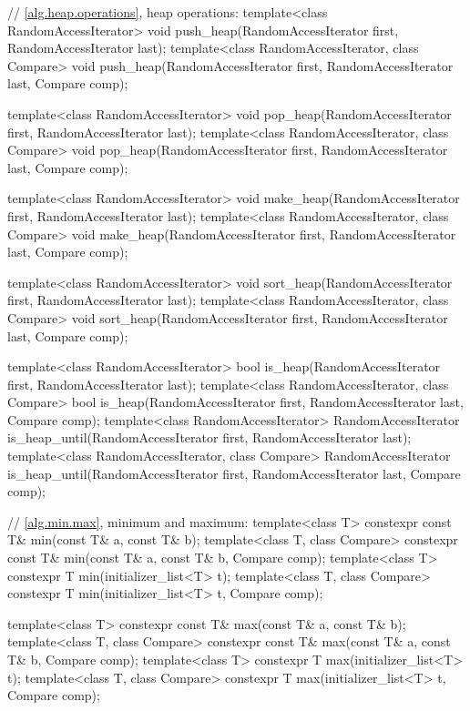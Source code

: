 \begin{codeblock}
{  // \ref{alg.heap.operations}, heap operations:
  template<class RandomAccessIterator>
    void push_heap(RandomAccessIterator first, RandomAccessIterator last);
  template<class RandomAccessIterator, class Compare>
    void push_heap(RandomAccessIterator first, RandomAccessIterator last,
                   Compare comp);

  template<class RandomAccessIterator>
    void pop_heap(RandomAccessIterator first, RandomAccessIterator last);
  template<class RandomAccessIterator, class Compare>
    void pop_heap(RandomAccessIterator first, RandomAccessIterator last,
                  Compare comp);

  template<class RandomAccessIterator>
    void make_heap(RandomAccessIterator first, RandomAccessIterator last);
  template<class RandomAccessIterator, class Compare>
    void make_heap(RandomAccessIterator first, RandomAccessIterator last,
                   Compare comp);

  template<class RandomAccessIterator>
    void sort_heap(RandomAccessIterator first, RandomAccessIterator last);
  template<class RandomAccessIterator, class Compare>
    void sort_heap(RandomAccessIterator first, RandomAccessIterator last,
                   Compare comp);

  template<class RandomAccessIterator>
    bool is_heap(RandomAccessIterator first, RandomAccessIterator last);
  template<class RandomAccessIterator, class Compare>
    bool is_heap(RandomAccessIterator first, RandomAccessIterator last, Compare comp);
  template<class RandomAccessIterator>
    RandomAccessIterator is_heap_until(RandomAccessIterator first, RandomAccessIterator last);
  template<class RandomAccessIterator, class Compare>
    RandomAccessIterator is_heap_until(RandomAccessIterator first, RandomAccessIterator last,
                                       Compare comp);

  // \ref{alg.min.max}, minimum and maximum:
  template<class T> constexpr const T& min(const T& a, const T& b);
  template<class T, class Compare>
    constexpr const T& min(const T& a, const T& b, Compare comp);
  template<class T>
    constexpr T min(initializer_list<T> t);
  template<class T, class Compare>
    constexpr T min(initializer_list<T> t, Compare comp);

  template<class T> constexpr const T& max(const T& a, const T& b);
  template<class T, class Compare>
    constexpr const T& max(const T& a, const T& b, Compare comp);
  template<class T>
    constexpr T max(initializer_list<T> t);
  template<class T, class Compare>
    constexpr T max(initializer_list<T> t, Compare comp);

}
\end{codeblock}
